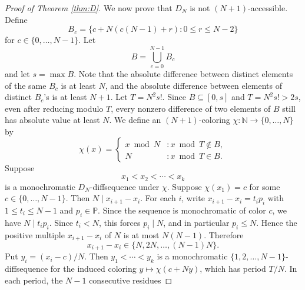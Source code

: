 \documentclass[10pt,a4paper]{amsart}
\begin{document}
\begin{proof}[Proof of Theorem \ref{thm:D}]
We now prove that $D_N$ is not $(N+1)$-accessible. Define $$B_c=\{c+N(c(N-1)+r):0\leq r\leq N-2\}$$ for $c \in \{0,\dots,N-1\}$. Let $$B=\bigcup_{c=0}^{N-1}B_c$$ and let $s=\max B.$ Note that the absolute difference between distinct elements of the same $B_c$ is at least $N$, and the absolute difference between elements of distinct $B_c$'s is at least $N+1$. Let $T=N^2s!$. Since $B\subseteq [0,s]$ and $T=N^2s!>2s$, even after reducing modulo $T$, every nonzero difference of two elements of $B$ still has absolute value at least $N$. We define an $(N+1)$-coloring $\chi : \mathbb{N} \to \{0,\dots,N\}$ by $$\chi(x)=\begin{cases}
    x\bmod N & : x\bmod T \notin B, \\
    N & : x\bmod T \in B.
\end{cases}$$ Suppose $$x_1<x_2<\cdots<x_k$$ is a monochromatic $D_N$-diffsequence under $\chi$. Suppose $\chi(x_1)=c$ for some $c \in \{0,\dots,N-1\}$. Then $N \mid x_{i+1}-x_i$. For each $i$, write $x_{i+1}-x_i=t_i p_i$ with $1\leq t_i\leq N-1$ and $p_i\in\mathbb{P}$. Since the sequence is monochromatic of color $c$, we have $N\mid t_i p_i$. Since $t_i<N$, this forces $p_i\mid N$, and in particular $p_i\leq N$. Hence the positive multiple $x_{i+1}-x_i$ of $N$ is at most $N(N-1)$. Therefore $$x_{i+1}-x_i \in \{N,2N,\dots,(N-1)N\}.$$ Put $y_i=(x_i-c)/N$. Then $y_1<\cdots<y_k$ is a monochromatic $\{1,2,\dots,N-1\}$-diffsequence for the induced coloring $y\mapsto \chi(c+Ny)$, which has period $T/N$. In each period, the $N-1$ consecutive residues

\end{proof}
\end{document}
